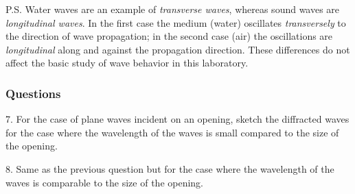 \documentclass[11pt]{NSF}
\begin{document}
P.S. Water waves are an example of {\em transverse waves}, 
whereas sound waves are {\em longitudinal waves}. 
In the first case the medium (water) oscillates {\em transversely} to 
the direction of wave propagation; in the second case (air) the 
oscillations are {\em longitudinal} along and against the 
propagation direction. 
These differences do not affect the basic study of wave behavior in this laboratory.

\subsubsection*{Questions}

7. For the case of plane waves incident on an opening, sketch the 
diffracted waves for the case where the wavelength of the waves is 
small compared to the size of the opening.

8. Same as the previous question but for the case where the 
wavelength of the waves is comparable to the size of the opening.
\end{document}
